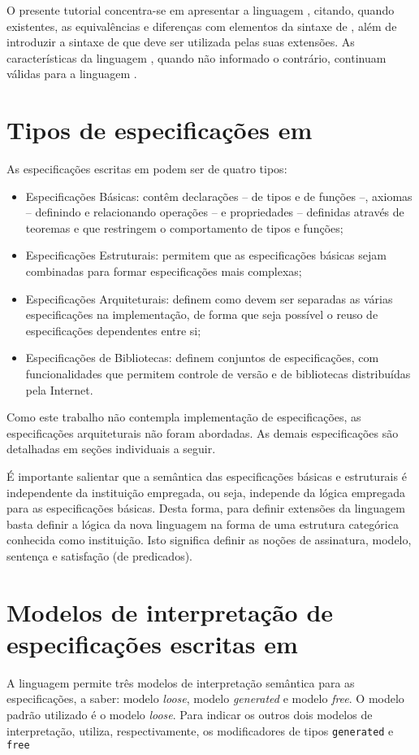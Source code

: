 O presente tutorial concentra-se em apresentar a linguagem \HasCASL, citando, quando existentes, as equivalências e diferenças com elementos da sintaxe de \CASL, além de introduzir a sintaxe de \CASL que deve ser utilizada pelas suas extensões.
As características da linguagem \CASL, quando não informado o contrário, continuam válidas para a linguagem \HasCASL.

\section{Tipos de especificações em \CASL}

As especificações escritas em \CASL podem ser de quatro tipos:
\begin{itemize}
\item Especificações Básicas: contêm declarações -- de tipos e de funções --, axiomas -- definindo e relacionando operações -- e propriedades -- definidas através de teoremas e que restringem o comportamento de tipos e funções;
\item Especificações Estruturais: permitem que as especificações básicas sejam combinadas para formar especificações mais complexas;
\item Especificações Arquiteturais: definem como devem ser separadas as várias especificações na implementação, de forma que seja possível o reuso de especificações dependentes entre si;
\item Especificações de Bibliotecas: definem conjuntos de especificações, com funcionalidades que permitem controle de versão e de bibliotecas distribuídas pela Internet.
\end{itemize}

Como este trabalho não contempla implementação de especificações, as especificações arquiteturais não foram abordadas.
As demais especificações são detalhadas em seções individuais a seguir.

É importante salientar que a semântica das especificações básicas e estruturais é independente da instituição empregada, ou seja, independe da lógica empregada para as especificações básicas.
Desta forma, para definir extensões da linguagem \CASL basta definir a lógica da nova linguagem na forma de uma estrutura categórica conhecida como instituição.
Isto significa definir as noções de assinatura, modelo, sentença e satisfação (de predicados).

\section{Modelos de interpretação de especificações escritas em \CASL}
A linguagem \CASL permite três modelos de interpretação semântica para as especificações, a saber: modelo \textit{loose}, modelo \textit{generated} e modelo \textit{free}.
O modelo padrão utilizado é o modelo \textit{loose}.
Para indicar os outros dois modelos de interpretação, \CASL utiliza, respectivamente, os modificadores de tipos \Verb.generated. e \Verb.free.

